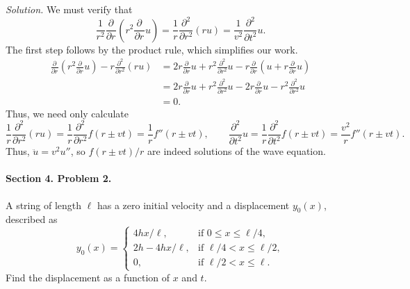 \documentclass[10pt]{article}
\newcommand\pp[3][]{\frac{\partial^{#1}{#2}}{\partial {#3}^{#1}}}
\begin{document}
\begin{enumerate}
                \textit{Solution.} We must verify that
                \[
                        \frac{1}{r^2}\pp{}{r}\left(r^2\pp{}{r}u\right) = \frac{1}{r}\pp[2]{}{r}(ru) = \frac{1}{v^2}\pp[2]{}{t}u.
                \]
                The first step follows by the product rule, which simplifies our work.
                \begin{align*}
                        \pp{}{r}\left(r^2\pp{}{r}u\right) - r\pp[2]{}{r}(ru)
                                &= 2r\pp{}{r}u + r^2\pp[2]{}{r}u - r\pp{}{r}\left(u + r\pp{}{r}u\right) \\
                                &= 2r\pp{}{r}u + r^2\pp[2]{}{r}u - 2r\pp{}{r}u - r^2\pp[2]{}{r}u \\
                                &= 0.
                \end{align*}
                Thus, we need only calculate
                \[
                        \frac{1}{r}\pp[2]{}{r}(r u) = \frac{1}{r}\pp[2]{}{r}f(r \pm vt) = \frac{1}{r}f''(r \pm vt), \quad\quad
                        \pp[2]{}{t}u = \frac{1}{r}\pp[2]{}{t}f(r \pm vt) = \frac{v^2}{r} f''(r \pm vt).
                \]
                Thus, $\ddot{u} = v^2u''$, so $f(r \pm vt) /r$ are indeed solutions of the wave equation.
        \end{enumerate}

        \paragraph{Section 4. Problem 2.} A string of length $\ell$ has a zero initial velocity and a displacement $y_0(x)$,
        described as
        \[
                y_0(x) = \begin{cases}
                        4hx /\ell, &\text{if } 0 \leq x \leq \ell/4, \\
                        2h - 4hx/\ell, &\text{if } \ell/4 < x \leq \ell/2, \\
                        0,      &\text{if } \ell/2 < x \leq \ell.
                \end{cases}
        \]
        Find the displacement as a function of $x$ and $t$. \\
\end{document}
